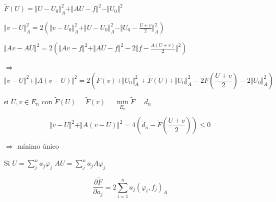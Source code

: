 \documentclass[a4paper,10pt]{book}
\begin{document}
\begin{enumerate}
$\tilde{F}(U) = \Vert U -U_0\Vert_A^2 + \Vert A U-f \Vert^2 -\Vert U_0\Vert^2$ 

$\Vert v-U\Vert_A^2 = 2 \left( \Vert v-U_0 \Vert_A^2 +\Vert U-U_0\Vert_A^2 - \Vert U_0 -\frac{U+v}{2}\Vert_A^2  \right)$

$\Vert Av -AU\Vert^2= 2\left(  \Vert  Av-f\Vert^2 + \Vert AU-f\Vert^2  - 2 \Vert f - \frac{A(U+v)}{2} \Vert^2\right)$

 $\Rightarrow$  
 \[
 \Vert v-U\Vert^2 + \Vert A (v-U)\Vert^2 = 2 \left( \tilde{F}(v) + \Vert U_0\Vert_A^2 + \tilde{F}(U) + \Vert U_0\Vert_A^2 - 2\tilde{F}\left( \frac{U+v}{2} \right) - 2 \Vert U_0\Vert_A^2 \right)  \]

si $U,v \in E_n $ con $\tilde{F}(U)= \tilde{F}(v) = \underset{E_n}{\min} \tilde{F} = d_n$

\[
 \Vert v-U\Vert^2 + \Vert A (v-U)\Vert^2 = 4\left( d_n - \tilde{F} \left(\frac{U+v}{2} \right) \right)\leq 0 
\]

$\Rightarrow$ mínimo único


Si $U= \sum\limits_j^n a_j \varphi_j $   $AU = \sum\limits_j^n a_j A \varphi_j$

\[
\frac{\partial \tilde{F}}{ \partial a_j } = 2 \sum\limits_{i=1}^n a_j (\varphi_i,f_j)_A
\]
  \end{enumerate}

 
\end{document}
